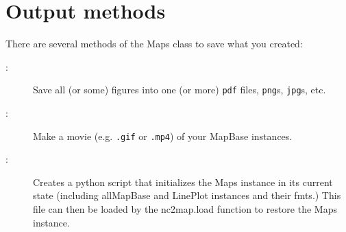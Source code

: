 \section{Output methods} \label{sec:output}
There are several methods of the \gls{Maps} class to save what you created:
\begin{description}
	\item[:] Save all (or some) figures into one (or more) \lstinline|pdf| files, \lstinline|png|s, \lstinline|jpg|s, etc.
	\item[:] Make a movie (e.g. \lstinline|.gif| or \lstinline|.mp4|) of your \gls{MapBase} instances.
	\item[:] Creates a python script that initializes the \gls{Maps} instance in its current state (including all\gls{MapBase} and \gls{LinePlot} instances and their \glspl{fmt}.) This file can then be loaded by the \gls{nc2map.load} function to restore the \gls{Maps} instance.
\end{description}


